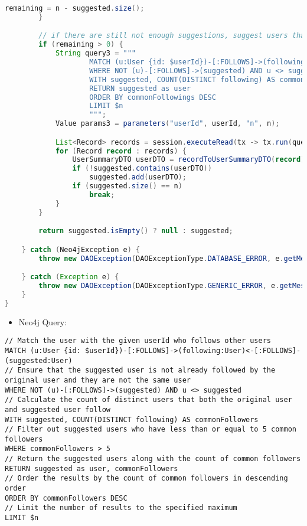 \begin{mdframed}[style=customstyle]
\begin{lstlisting}[language=java]
            remaining = n - suggested.size();
        }

        // if there are still not enough suggestions, suggest users that follow the user's followings
        if (remaining > 0) {
            String query3 = """
                    MATCH (u:User {id: $userId})-[:FOLLOWS]->(following:User)<-[:FOLLOWS]-(suggested:User)
                    WHERE NOT (u)-[:FOLLOWS]->(suggested) AND u <> suggested
                    WITH suggested, COUNT(DISTINCT following) AS commonFollowings
                    RETURN suggested as user
                    ORDER BY commonFollowings DESC
                    LIMIT $n
                    """;
            Value params3 = parameters("userId", userId, "n", n);

            List<Record> records = session.executeRead(tx -> tx.run(query3, params3).list());
            for (Record record : records) {
                UserSummaryDTO userDTO = recordToUserSummaryDTO(record);
                if (!suggested.contains(userDTO))
                    suggested.add(userDTO);
                if (suggested.size() == n)
                    break;
            }
        }

        return suggested.isEmpty() ? null : suggested;

    } catch (Neo4jException e) {
        throw new DAOException(DAOExceptionType.DATABASE_ERROR, e.getMessage());

    } catch (Exception e) {
        throw new DAOException(DAOExceptionType.GENERIC_ERROR, e.getMessage());
    }
}\end{lstlisting}
\end{mdframed}

\newpage

\begin{itemize}
    \item Neo4j Query:
\end{itemize}

\begin{mdframed}[style=customstyle]
\begin{lstlisting}[language=Cypher]
// Match the user with the given userId who follows other users
MATCH (u:User {id: $userId})-[:FOLLOWS]->(following:User)<-[:FOLLOWS]-(suggested:User) 
// Ensure that the suggested user is not already followed by the original user and they are not the same user
WHERE NOT (u)-[:FOLLOWS]->(suggested) AND u <> suggested 
// Calculate the count of distinct users that both the original user and suggested user follow
WITH suggested, COUNT(DISTINCT following) AS commonFollowers 
// Filter out suggested users who have less than or equal to 5 common followers
WHERE commonFollowers > 5 
// Return the suggested users along with the count of common followers
RETURN suggested as user, commonFollowers 
// Order the results by the count of common followers in descending order
ORDER BY commonFollowers DESC 
// Limit the number of results to the specified maximum
LIMIT $n\end{lstlisting}
\end{mdframed}

